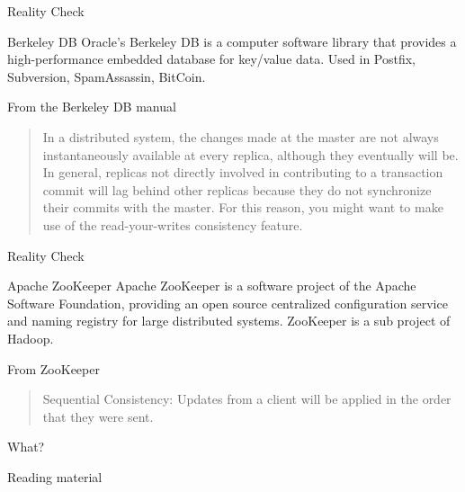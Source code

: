 \begin{frame}{Reality Check}

\begin{block}{Berkeley DB}
Oracle's Berkeley DB is a computer software library that provides a 
high-performance embedded database for key/value data. Used in Postfix,
Subversion, SpamAssassin, BitCoin.
\end{block}

\smallskip
\begin{block}{From the Berkeley DB manual}
\begin{quote}
In a distributed system, the changes made at the master are not always
instantaneously available at every replica, although they \alert{eventually}
will be. In general, replicas not directly involved in contributing to a
transaction commit will lag behind other replicas because they do not
synchronize their commits with the master. For this reason, you might want to
make use of the \alert{read-your-writes} consistency feature.
\end{quote}
\end{block}

\end{frame}

\begin{frame}{Reality Check}

\begin{block}{Apache ZooKeeper}
Apache ZooKeeper is a software project of the Apache Software Foundation,
providing an open source centralized configuration service and naming registry
for large distributed systems. ZooKeeper is a sub project of Hadoop.
\end{block}

\smallskip
\begin{block}{From ZooKeeper}
\begin{quote}
\alert{Sequential Consistency}: Updates from a client will be applied in the order that they were sent.
\end{quote}
\end{block}

\bigskip
What?

\end{frame}

\begin{frame}{Reading material}

\begin{Bib}
{\footnotesize
\BIL
\item {}
\EIL
}
\end{Bib}

\end{frame}

